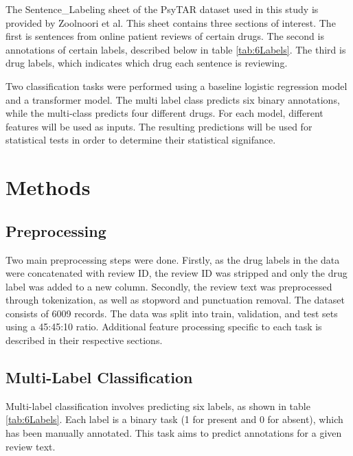 \documentclass[10.7pt, onecolumn]{article}
\begin{document}
The Sentence\_Labeling sheet of the PsyTAR dataset used in this study is provided by Zoolnoori et al\cite{psyTAR1}\cite{psyTar2}. This sheet contains three sections of interest. The first is sentences from online patient reviews of certain drugs. The second is annotations of certain labels, described below in table \ref{tab:6Labels}. The third is drug labels, which indicates which drug each sentence is reviewing.

Two classification tasks were performed using a baseline logistic regression model and a transformer model. The multi label class predicts six binary annotations, while the multi-class predicts four different drugs. For each model, different features will be used as inputs. The resulting predictions will be used for statistical tests in order to determine their statistical signifance. 

\section{Methods}\label{methods}

\subsection{Preprocessing}
Two main preprocessing steps were done. Firstly, as the drug labels in the data were concatenated with review ID, the review ID was stripped and only the drug label was added to a new column. Secondly, the review text was preprocessed through tokenization, as well as stopword and punctuation removal. The dataset consists of 6009 records. The data was split into train, validation, and test sets using a 45:45:10 ratio. Additional feature processing specific to each task is described in their respective sections.
\subsection{Multi-Label Classification}
Multi-label classification involves predicting six labels, as shown in table \ref{tab:6Labels}. Each label is a binary task (1 for present and 0 for absent), which has been manually annotated. This task aims to predict annotations for a given review text.
\end{document}
